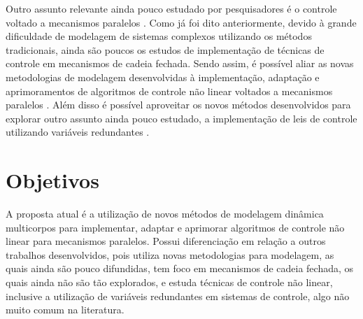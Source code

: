 \documentclass[a4paper,11pt,brazil,fleqn]{article}
\begin{document}
	Outro assunto relevante ainda pouco estudado por pesquisadores \'e o controle voltado a mecanismos paralelos \cite{Merlet2002}. Como j\'a foi dito anteriormente, devido \`a grande dificuldade de modelagem de sistemas complexos utilizando os m\'etodos tradicionais, ainda s\~ao poucos os estudos de implementa\c{c}\~ao de t\'ecnicas de controle em mecanismos de cadeia fechada. Sendo assim, \'e poss\'ivel aliar as novas metodologias de modelagem desenvolvidas \`a implementa\c{c}\~ao, adapta\c{c}\~ao e aprimoramentos de algoritmos de controle n\~ao linear voltados a mecanismos paralelos \cite{Craig, Slotini}. Al\'em disso \'e poss\'ivel aproveitar os novos m\'etodos desenvolvidos para explorar outro assunto ainda pouco estudado, a implementa\c{c}\~ao de leis de controle utilizando vari\'aveis redundantes \cite{ Rynaldo,Jarzebowska2009, Zubizarreta, Bloch}.


\section{Objetivos}\label{S02}

A proposta atual \'e a utiliza\c{c}\~ao de novos m\'etodos de modelagem din\^amica multicorpos para implementar, adaptar e aprimorar algoritmos de controle n\~ao linear para mecanismos paralelos. Possui diferencia\c{c}\~ao em rela\c{c}\~ao a outros trabalhos desenvolvidos, pois utiliza novas metodologias para modelagem, as quais ainda s\~ao pouco difundidas, tem foco em mecanismos de cadeia fechada, os quais ainda n\~ao s\~ao t\~ao explorados, e estuda t\'ecnicas de controle n\~ao linear, inclusive a utiliza\c{c}\~ao de vari\'aveis redundantes em sistemas de controle, algo n\~ao muito comum na literatura.
\end{document}

